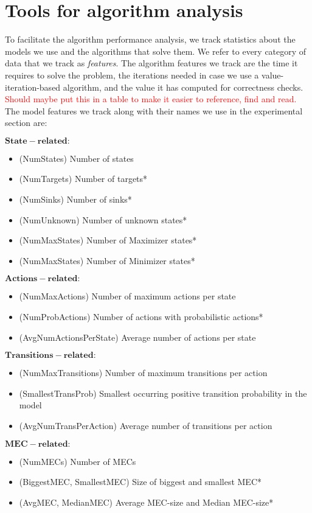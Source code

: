 \chapter{Tools for algorithm analysis} \label{ch:analysis}

To facilitate the algorithm performance analysis, we track statistics about the models we use and the algorithms that solve them. 
We refer to every category of data that we track as \emph{features}.
The algorithm features we track are the time it requires to solve the problem, the iterations needed in case we use a value-iteration-based algorithm, 
and the value it has computed for correctness checks.
\textcolor{red}{Should maybe put this in a table to make it easier to reference, find and read.}
The model features we track along with their names we use in the experimental section are:

$\mathbf{State-related:}$
\begin{itemize}
\item (NumStates) Number of states
\item (NumTargets) Number of targets*
\item (NumSinks) Number of sinks*
\item (NumUnknown) Number of unknown states*
\item (NumMaxStates) Number of Maximizer states*
\item (NumMaxStates) Number of Minimizer states*
\end{itemize}

$\mathbf{Actions-related:}$
\begin{itemize}
\item (NumMaxActions) Number of maximum actions per state
\item (NumProbActions) Number of actions with probabilistic actions*
\item (AvgNumActionsPerState) Average number of actions per state
\end{itemize}

$\mathbf{Transitions-related:}$
\begin{itemize}
\item (NumMaxTransitions) Number of maximum transitions per action
\item (SmallestTransProb) Smallest occurring positive transition probability in the model
\item (AvgNumTransPerAction) Average number of transitions per action
\end{itemize} 

$\mathbf{MEC-related:}$
\begin{itemize}
\item (NumMECs) Number of MECs
\item (BiggestMEC, SmallestMEC) Size of biggest and smallest MEC*
\item (AvgMEC, MedianMEC) Average MEC-size and Median MEC-size*
\end{itemize}

